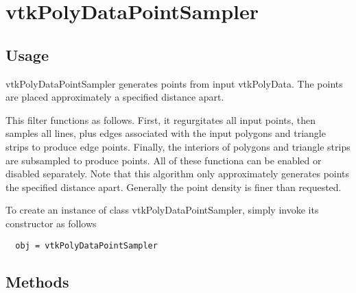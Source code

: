 \section{vtkPolyDataPointSampler}

\subsection{Usage}

 vtkPolyDataPointSampler generates points from input vtkPolyData. The
 points are placed approximately a specified distance apart.

 This filter functions as follows. First, it regurgitates all input points,
 then samples all lines, plus edges associated with the input polygons and
 triangle strips to produce edge points. Finally, the interiors of polygons
 and triangle strips are subsampled to produce points.  All of these
 functiona can be enabled or disabled separately. Note that this algorithm
 only approximately generates points the specified distance apart. 
 Generally the point density is finer than requested.


To create an instance of class vtkPolyDataPointSampler, simply
invoke its constructor as follows
\begin{verbatim}
  obj = vtkPolyDataPointSampler
\end{verbatim}
\subsection{Methods}

